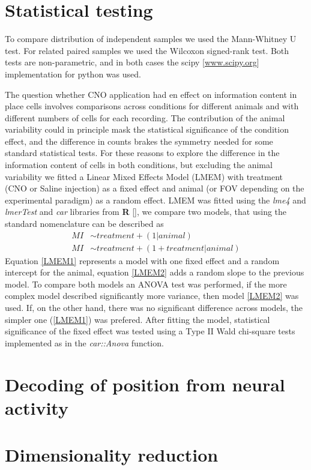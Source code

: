 \section{Statistical testing}
\label{chap3:sec:8:stats}
To compare distribution of independent samples we used the Mann-Whitney U test. 
For related paired samples we used the Wilcoxon signed-rank test. 
Both tests are non-parametric, and in both cases the scipy [\url{www.scipy.org}] implementation for python was used. 

The question whether CNO application had en effect on information content in place cells involves comparisons across conditions for different animals and with different numbers of cells for each recording.
The contribution of the animal variability could in principle mask the statistical significance of the condition effect, and the difference in counts brakes the symmetry needed for some standard statistical tests. 
For these reasons to explore the difference in the information content of cells in both conditions, but excluding the animal variability we fitted a Linear Mixed Effects Model (LMEM) with treatment (CNO or Saline injection) as a fixed effect and animal (or FOV depending on the experimental paradigm) as a random effect. 
LMEM was fitted using the \textit{lme4} and \textit{lmerTest} and \textit{car} libraries from \textbf{R} [\cite{Rsoftware}], we compare two models, that using the standard nomenclature can be described as
\begin{align}
    MI & \sim treatment + (1|animal) \label{LMEM1} \\
    MI & \sim treatment + (1+treatment|animal) \label{LMEM2}
\end{align}
Equation \ref{LMEM1} represents a model with one fixed effect and a random intercept for the animal, equation \ref{LMEM2} adds a random slope to the previous model. 
To compare both models an ANOVA test was performed, if the more complex model described significantly more variance, then model \ref{LMEM2} was used.
If, on the other hand, there was no significant difference across models, the simpler one (\ref{LMEM1}) was prefered. 
After fitting the model, statistical significance of the fixed effect was tested using a Type II Wald chi-square tests implemented as in the \textit{car::Anova} function.


\section{Decoding of position from neural activity}
\label{chap3:sec:9:decoders}

\section{Dimensionality reduction}
\label{chap3:sec:10:dim_red}
